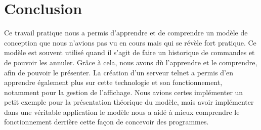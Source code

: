 \documentclass[french]{article}
\begin{document}
	\section{Conclusion}
	Ce travail pratique nous a permis d'apprendre et de comprendre un modèle de conception que nous n'avions pas vu en cours mais qui se révèle fort pratique. Ce modèle est souvent utilisé quand il s'agit de faire un historique de commandes et de pouvoir les annuler. Grâce à cela, nous avons dù l'apprendre et le comprendre, afin de pouvoir le présenter. La création d'un serveur telnet a permis d'en apprendre également plus sur cette technologie et son fonctionnement, notamment pour la gestion de l'affichage. Nous avions certes implémenter un petit exemple pour la présentation théorique du modèle, mais avoir implémenter dans une véritable application le modèle nous a aidé à mieux comprendre le fonctionnement derrière cette façon de concevoir des programmes.
\end{document}
